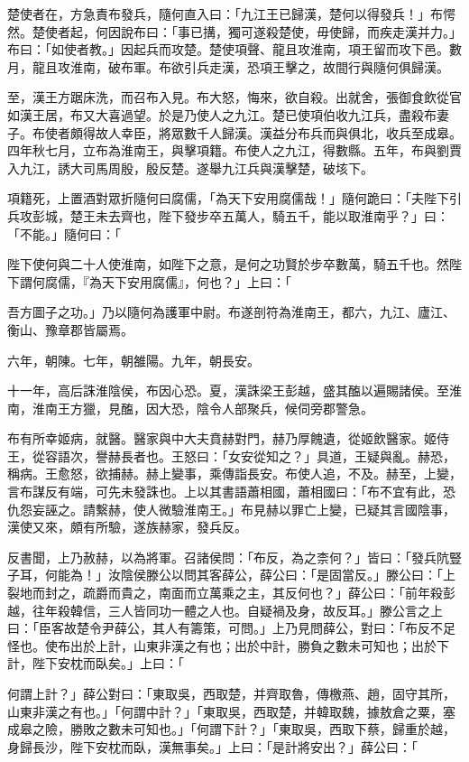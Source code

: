 \begin{pinyinscope}
楚使者在，方急責布發兵，隨何直入曰：「九江王已歸漢，楚何以得發兵！」布愕然。楚使者起，何因說布曰：「事已搆，獨可遂殺楚使，毋使歸，而疾走漢并力。」布曰：「如使者教。」因起兵而攻楚。楚使項聲、龍且攻淮南，項王留而攻下邑。數月，龍且攻淮南，破布軍。布欲引兵走漢，恐項王擊之，故間行與隨何俱歸漢。

至，漢王方踞床洗，而召布入見。布大怒，悔來，欲自殺。出就舍，張御食飲從官如漢王居，布又大喜過望。於是乃使人之九江。楚已使項伯收九江兵，盡殺布妻子。布使者頗得故人幸臣，將眾數千人歸漢。漢益分布兵而與俱北，收兵至成皋。四年秋七月，立布為淮南王，與擊項籍。布使人之九江，得數縣。五年，布與劉賈入九江，誘大司馬周殷，殷反楚。遂舉九江兵與漢擊楚，破垓下。

項籍死，上置酒對眾折隨何曰腐儒，「為天下安用腐儒哉！」隨何跪曰：「夫陛下引兵攻彭城，楚王未去齊也，陛下發步卒五萬人，騎五千，能以取淮南乎？」曰：「不能。」隨何曰：「

陛下使何與二十人使淮南，如陛下之意，是何之功賢於步卒數萬，騎五千也。然陛下謂何腐儒，『為天下安用腐儒』，何也？」上曰：「

吾方圖子之功。」乃以隨何為護軍中尉。布遂剖符為淮南王，都六，九江、廬江、衡山、豫章郡皆屬焉。

六年，朝陳。七年，朝雒陽。九年，朝長安。

十一年，高后誅淮陰侯，布因心恐。夏，漢誅梁王彭越，盛其醢以遍賜諸侯。至淮南，淮南王方獵，見醢，因大恐，陰令人部聚兵，候伺旁郡警急。

布有所幸姬病，就醫。醫家與中大夫賁赫對門，赫乃厚餽遺，從姬飲醫家。姬侍王，從容語次，譽赫長者也。王怒曰：「女安從知之？」具道，王疑與亂。赫恐，稱病。王愈怒，欲捕赫。赫上變事，乘傳詣長安。布使人追，不及。赫至，上變，言布謀反有端，可先未發誅也。上以其書語蕭相國，蕭相國曰：「布不宜有此，恐仇怨妄誣之。請繫赫，使人微驗淮南王。」布見赫以罪亡上變，已疑其言國陰事，漢使又來，頗有所驗，遂族赫家，發兵反。

反書聞，上乃赦赫，以為將軍。召諸侯問：「布反，為之柰何？」皆曰：「發兵阬豎子耳，何能為！」汝陰侯滕公以問其客薛公，薛公曰：「是固當反。」滕公曰：「上裂地而封之，疏爵而貴之，南面而立萬乘之主，其反何也？」薛公曰：「前年殺彭越，往年殺韓信，三人皆同功一體之人也。自疑禍及身，故反耳。」滕公言之上曰：「臣客故楚令尹薛公，其人有籌策，可問。」上乃見問薛公，對曰：「布反不足怪也。使布出於上計，山東非漢之有也；出於中計，勝負之數未可知也；出於下計，陛下安枕而臥矣。」上曰：「

何謂上計？」薛公對曰：「東取吳，西取楚，并齊取魯，傳檄燕、趙，固守其所，山東非漢之有也。」「何謂中計？」「東取吳，西取楚，并韓取魏，據敖倉之粟，塞成皋之險，勝敗之數未可知也。」「何謂下計？」「東取吳，西取下蔡，歸重於越，身歸長沙，陛下安枕而臥，漢無事矣。」上曰：「是計將安出？」薛公曰：「


\end{pinyinscope}
